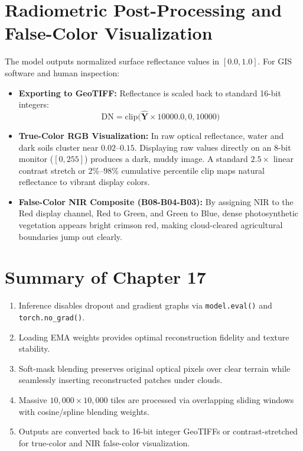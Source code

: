 \section{Radiometric Post-Processing and False-Color Visualization}
The model outputs normalized surface reflectance values in $[0.0, 1.0]$. For GIS software and human inspection:
\begin{itemize}
    \item \textbf{Exporting to GeoTIFF:} Reflectance is scaled back to standard 16-bit integers:
    \begin{equation}
    \text{DN} = \text{clip}\big(\hat{\mathbf{Y}} \times 10000.0, 0, 10000\big)
    \end{equation}
    \item \textbf{True-Color RGB Visualization:} In raw optical reflectance, water and dark soils cluster near $0.02\text{--}0.15$. Displaying raw values directly on an 8-bit monitor ($[0, 255]$) produces a dark, muddy image. A standard $2.5\times$ linear contrast stretch or 2\%--98\% cumulative percentile clip maps natural reflectance to vibrant display colors.
    \item \textbf{False-Color NIR Composite (B08-B04-B03):} By assigning NIR to the Red display channel, Red to Green, and Green to Blue, dense photosynthetic vegetation appears bright crimson red, making cloud-cleared agricultural boundaries jump out clearly.
\end{itemize}

\section{Summary of Chapter 17}
\begin{enumerate}
    \item Inference disables dropout and gradient graphs via \texttt{model.eval()} and \texttt{torch.no\_grad()}.
    \item Loading EMA weights provides optimal reconstruction fidelity and texture stability.
    \item Soft-mask blending preserves original optical pixels over clear terrain while seamlessly inserting reconstructed patches under clouds.
    \item Massive $10{,}000 \times 10{,}000$ tiles are processed via overlapping sliding windows with cosine/spline blending weights.
    \item Outputs are converted back to 16-bit integer GeoTIFFs or contrast-stretched for true-color and NIR false-color visualization.
\end{enumerate}


